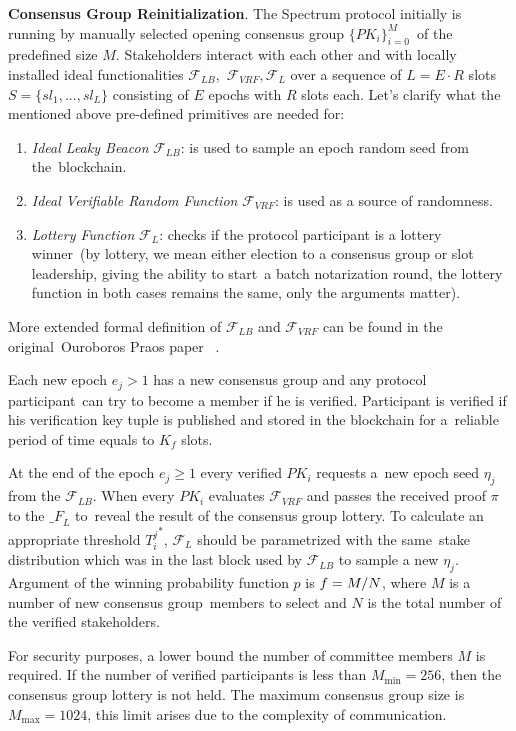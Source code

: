 \textbf{Consensus Group Reinitialization}.
The Spectrum protocol initially is running by manually selected opening consensus group $\{PK_i\}_{i=0}^M$\
of the predefined size $M$.
Stakeholders interact with each other and with locally installed ideal functionalities ${\mathcal{F}}_{LB}$,\
${\mathcal{F}}_{VRF}, {\mathcal{F}}_{L}$ over a sequence of $L = E \cdot R$ slots\
${S=\{sl_1,...,sl_L\}}$ consisting of $E$ epochs with $R$ slots each.
Let's clarify what the mentioned above pre-defined primitives are needed for:
\begin{enumerate}
    \item \emph{Ideal Leaky Beacon} ${\mathcal{F}}_{LB}$: is used to sample an epoch random seed from the\
    blockchain.
    \item \emph{Ideal Verifiable Random Function} ${\mathcal{F}}_{VRF}$: is used as a source of randomness.
    \item \emph{Lottery Function} ${\mathcal{F}}_{L}$: checks if the protocol participant is a lottery winner\
    (by lottery, we mean either election to a consensus group or slot leadership, giving the ability to start\
    a batch notarization round, the lottery function in both cases remains the same, only the arguments matter).
\end{enumerate}
More extended formal definition of ${\mathcal{F}}_{LB}$ and ${\mathcal{F}}_{VRF}$ can be found in the original\
Ouroboros Praos paper ~\cite{cryptoeprint:2017/573}.

Each new epoch ${e_j \gt 1}$ has a new consensus group and any protocol participant\
can try to become a member if he is verified.
Participant is verified if his verification key tuple is published and stored in the blockchain for a\
reliable period of time equals to $K_f$ slots.

At the end of the epoch ${e_j \geq 1}$ every verified $PK_i$ requests a\
new epoch seed $\eta_j$ from the ${\mathcal{F}}_{LB}$.
When every $PK_i$ evaluates ${\mathcal{F}}_{VRF}$ and passes the received proof $\pi$ to the ${\mathcal_{F}}_{L}$ to\
reveal the result of the consensus group lottery.
To calculate an appropriate threshold ${T_i^j}^*$, ${\mathcal{F}}_{L}$ should be parametrized with the same\
stake distribution which was in the last block used by ${\mathcal{F}}_{LB}$ to sample a new $\eta_j$.
Argument of the winning probability function $p$ is ${f = M /\/ N}$, where $M$ is a number of new consensus group\
members to select and $N$ is the total number of the verified stakeholders.

For security purposes, a lower bound the number of committee members $M$ is required.
If the number of verified participants is less than ${M_{\min}=256}$, then the consensus group lottery is not held.
The maximum consensus group size is ${M_{\max}=1024}$, this limit arises due to the complexity of communication.

